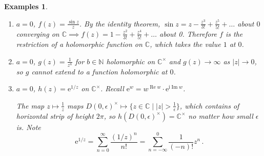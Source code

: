 \documentclass{article}
\theoremstyle{plain}\theoremheaderfont{\normalfont\itshape}\theorembodyfont{\rmfamily}\theoremseparator{.}\newtheorem*{rem}{Remark}\newtheorem*{ex}{Example}\newtheorem*{proof}{Proof}\newtheorem*{altp}{Alternative proof}\newtheorem*{con}{Consequences}\newtheorem*{notn}{Notations}\newtheorem*{cau}{Caution}\newtheorem*{term}{Terminology}\newtheorem*{keyex}{Key example}
\theoremstyle{plain}\theoremheaderfont{\normalfont\bfseries}\theorembodyfont{\rmfamily}\theoremseparator{.}\newtheorem{thm}{Theorem}[section]\newtheorem{lem}[thm]{Lemma}\newtheorem{prop}[thm]{Proposition}\newtheorem*{cor}{Corollary}\newtheorem{defn}[thm]{Definition}\newtheorem{clm}[thm]{Claim}\newtheorem{clminproof}{Claim}\newtheorem{leminproof}{Lemma}\newtheorem{app}{Application}
\theoremstyle{break}\theoremheaderfont{\normalfont\itshape}\theorembodyfont{\rmfamily}\theoremseparator{.\medskip}\newtheorem*{proofskip}{Proof}\newtheorem*{exs}{Examples}\newtheorem*{rems}{Remarks}\newtheorem*{rec}{Recall}\newtheorem*{ppts}{Properties}
\theoremstyle{break}\theoremheaderfont{\normalfont\bfseries}\theorembodyfont{\rmfamily}\theoremseparator{.\medskip}\newtheorem{lemskip}[thm]{Lemma}\newtheorem{defnskip}[thm]{Definition}\newtheorem{propskip}[thm]{Proposition}\newtheorem{thmskip}[thm]{Theorem}
\numberwithin{equation}{section}
\newcommand{\ii}{\mathrm{i}}
\newcommand{\ee}{\mathrm{e}}
\newcommand{\abs}[1]{\left|#1\right|}
\newcommand{\NN}{\mathbb{N}}
\newcommand{\CC}{\mathbb{C}}
\renewcommand{\Re}{\operatorname{Re}}
\renewcommand{\Im}{\operatorname{Im}}
\begin{document}
    \begin{exs}
        \begin{enumerate}[topsep=0pt,label=(\roman*)]
            \item \(a=0\), \(f(z)=\frac{\sin z}{z}\). By the identity theorem, \(\sin z=z-\frac{z^3}{3!}+\frac{z^5}{5!}+\dots\) about \(0\) converging on \(\CC\implies f(z)=1-\frac{z^2}{3!}+\frac{z^4}{5!}+\dots\) about 0. Therefore \(f\) is the restriction of a holomorphic function on \(\CC\), which takes the value \(1\) at \(0\).
            \item \(a=0\), \(g(z)=\frac{1}{z^n}\) for \(b\in\NN\) holomorphic on \(\CC^\times\) and \(g(z)\to \infty\) as \(\abs{z}\to 0\), so \(g\) cannot extend to a function holomorphic at \(0\).
            \item \(a=0\), \(h(z)=\ee^{1/z}\) on \(\CC^\times\). Recall \(\ee^{w}=w^{\Re w}\cdot \ee^{\ii \Im w}\).
            \begin{figure}[ht!]
                \centering
            \end{figure}

            The map \(z\mapsto \frac{1}{z}\) maps \(D(0,\epsilon)^\times\mapsto\{z\in\CC\mid\abs{z}>\frac{1}{\epsilon}\}\), which contains of horizontal strip of height \(2\pi\), so \(h(D(0,\epsilon)^\times)=\CC^\times\) no matter how small \(\epsilon\) is. Note
            \[\ee^{1/z}=\sum_{n=0}^{\infty}\frac{(1/z)^n}{n!}=\sum_{n=-\infty}^{0}\frac{1}{(-n)!}z^n\,.\]
        \end{enumerate}
    \end{exs}
    
\end{document}
